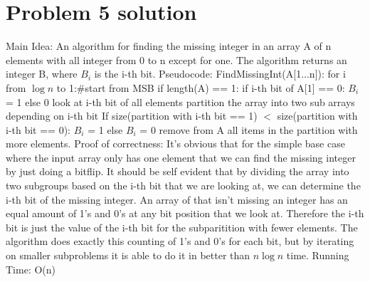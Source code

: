 \documentclass[11pt]{article}
\begin{document}
\section*{Problem 5 solution}
Main Idea:\newline
An algorithm for finding the missing integer in an array A of n elements with all integer from 0 to n except for one. The algorithm returns an integer B, where $B_i$ is the i-th bit.
\newline
Pseudocode:\newline
FindMissingInt(A[1...n]):\newline
\indent for i from $\log n$ to 1:\indent \#start from MSB\newline 
\indent \indent if length(A) == 1:\newline
\indent \indent \indent if i-th bit of A[1] == 0:\newline
\indent \indent \indent \indent $B_i$ = 1 else 0\newline
\indent \indent look at i-th bit of all elements\newline
\indent \indent partition the array into two sub arrays 
depending on i-th bit\newline
\indent \indent If size(partition with i-th bit == 1) $<$ size(partition with i-th bit == 0):\newline
\indent \indent \indent $B_i$ = 1 else $B_i$ =  0 \newline
\indent \indent remove from A all items in the partition with more elements.\newline
\newline
Proof of correctness:\newline
It's obvious that for the simple base case where the input array only has one element that we can find the missing integer by just doing a bitflip. It should be self evident that by dividing the array into two subgroups based on the i-th bit that we are looking at, we can determine the i-th bit of the missing integer. An array of that isn't missing an integer has an equal amount of 1's and  0's at any bit position that we look at. Therefore the i-th bit is just the value of the i-th bit for the subparitition with fewer elements. The algorithm does exactly this counting of 1's and 0's for each bit, but by iterating on smaller subproblems it is able to do it in better than $n\log n$ time.
\newline
\newline
Running Time: O(n)\newline
\newline
\end{document}
